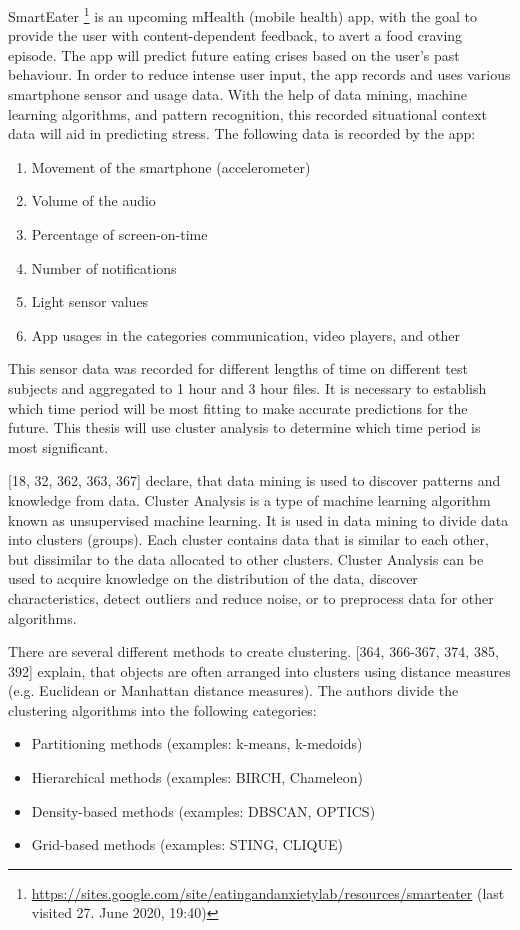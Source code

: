 SmartEater \footnote{\url{https://sites.google.com/site/eatingandanxietylab/resources/smarteater} (last visited 27. June 2020, 19:40)} is an upcoming mHealth (mobile health) app, with the goal to provide the user with content-dependent feedback, to avert a food craving episode. The app will predict future eating crises based on the user's past behaviour. In order to reduce intense user input, the app records and uses various smartphone sensor and usage data. With the help of data mining, machine learning algorithms, and pattern recognition, this recorded situational context data will aid in predicting stress. The following data is recorded by the app:

\begin{enumerate}
	\item Movement of the smartphone (accelerometer)
	\item Volume of the audio
	\item Percentage of screen-on-time
	\item Number of notifications
	\item Light sensor values
	\item App usages in the categories communication, video players, and other
\end{enumerate}

This sensor data was recorded for different lengths of time on different test subjects and aggregated to 1 hour and 3 hour files. It is necessary to establish which time period will be most fitting to make accurate predictions for the future. This thesis will use cluster analysis to determine which time period is most significant.

\textcite{han2011data}[18, 32, 362, 363, 367] declare, that data mining is used to discover patterns and knowledge from data. Cluster Analysis is a type of machine learning algorithm known as unsupervised machine learning. It is used in data mining to divide data into clusters (groups). Each cluster contains data that is similar to each other, but dissimilar to the data allocated to other clusters. Cluster Analysis can be used to acquire knowledge on the distribution of the data, discover characteristics, detect outliers and reduce noise, or to preprocess data for other algorithms. 

There are several different methods to create clustering. \textcite{han2011data}[364, 366-367, 374, 385, 392] explain, that objects are often arranged into clusters using distance measures (e.g. Euclidean or Manhattan distance measures). 
The authors divide the clustering algorithms into the following categories:
\begin{itemize}
	\item Partitioning methods (examples: k-means, k-medoids)
	\item Hierarchical methods (examples: BIRCH, Chameleon)
	\item Density-based methods (examples: DBSCAN, OPTICS)
	\item Grid-based methods (examples: STING, CLIQUE)
\end{itemize}


